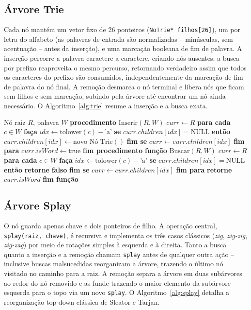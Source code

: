 \documentclass[conference]{IEEEtran}
\begin{document}
\subsection{Árvore Trie}
Cada nó mantém um vetor fixo de 26 ponteiros (\texttt{NoTrie* filhos[26]}), um por letra do alfabeto (as palavras de entrada são normalizadas -- minúsculas, sem acentuação -- antes da inserção), e uma marcação booleana de fim de palavra. A inserção percorre a palavra caractere a caractere, criando nós ausentes; a busca por prefixo reaproveita o mesmo percurso, retornando verdadeiro assim que todos os caracteres do prefixo são consumidos, independentemente da marcação de fim de palavra do nó final. A remoção desmarca o nó terminal e libera nós que ficam sem filhos e sem marcação, subindo pela árvore até encontrar um nó ainda necessário. O Algoritmo~\ref{alg:trie} resume a inserção e a busca exata.

\begin{algorithm}[H]
\caption{Inserção e Busca na Árvore Trie}
\label{alg:trie}
\begin{algorithmic}[1]
\REQUIRE Nó raiz $R$, palavra $W$
\STATE \textbf{procedimento} $\text{Inserir}(R, W)$
\STATE \quad $curr \gets R$
\STATE \quad \textbf{para cada} $c \in W$ \textbf{faça}
\STATE \quad \quad $idx \gets \text{tolower}(c) - \text{'a'}$
\STATE \quad \quad \textbf{se} $curr.children[idx] = \text{NULL}$ \textbf{então}
\STATE \quad \quad \quad $curr.children[idx] \gets \text{novo Nó Trie}()$
\STATE \quad \quad \textbf{fim se}
\STATE \quad \quad $curr \gets curr.children[idx]$
\STATE \quad \textbf{fim para}
\STATE \quad $curr.isWord \gets \text{true}$
\STATE \textbf{fim procedimento}
\STATE \textbf{função} $\text{Buscar}(R, W)$
\STATE \quad $curr \gets R$
\STATE \quad \textbf{para cada} $c \in W$ \textbf{faça}
\STATE \quad \quad $idx \gets \text{tolower}(c) - \text{'a'}$
\STATE \quad \quad \textbf{se} $curr.children[idx] = \text{NULL}$ \textbf{então}
\STATE \quad \quad \quad \textbf{retorne} \textbf{falso}
\STATE \quad \quad \textbf{fim se}
\STATE \quad \quad $curr \gets curr.children[idx]$
\STATE \quad \textbf{fim para}
\STATE \quad \textbf{retorne} $curr.isWord$
\STATE \textbf{fim função}
\end{algorithmic}
\end{algorithm}

\subsection{Árvore Splay}
O nó guarda apenas chave e dois ponteiros de filho. A operação central, \texttt{splay(raiz, chave)}, é recursiva e implementa os três casos clássicos (\textit{zig}, \textit{zig-zig}, \textit{zig-zag}) por meio de rotações simples à esquerda e à direita. Tanto a busca quanto a inserção e a remoção chamam \texttt{splay} antes de qualquer outra ação -- inclusive buscas malsucedidas reorganizam a árvore, trazendo o último nó visitado no caminho para a raiz. A remoção separa a árvore em duas subárvores ao redor do nó removido e as funde trazendo o maior elemento da subárvore esquerda para o topo via um novo \texttt{splay}. O Algoritmo~\ref{alg:splay} detalha a reorganização top-down clássica de Sleator e Tarjan.
\end{document}
